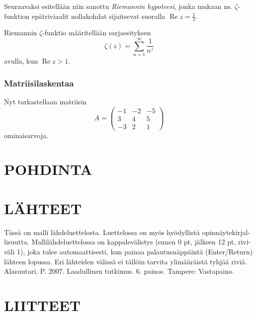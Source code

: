 Seuraavaksi esitellään niin sanottu {\em Riemannin hypoteesi}, jonka mukaan ns. $\zeta$-funktion epätriviaalit nollakohdat sijaitsevat suoralla $\operatorname{Re}z=\frac12$.
\begin{definition} Riemannin $\zeta$-funktio määritellään sarjaesityksen \cite{Riemann}
\[
\zeta(z)=\sum_{n=1}^{\infty}\frac{1}{n^z}
\]
avulla, kun $\operatorname{Re}z>1$.
\end{definition}

\subsubsection{Matriisilaskentaa}

Nyt tarkastellaan matriisin
\[
A=\left(\begin{array}{rrr} -1 & -2 & -5\\ 3& 4& 5\\ -3 & 2 & 1 \end{array}\right)
\]
ominaisarvoja.


\section{POHDINTA}
\lipsum[1]
\vspace{0.7cm}
\lipsum[1]



\newpage\null
\section{LÄHTEET}
 
 Tässä on malli lähdeluettelosta. Luettelossa on myös hyödyllistä opinnäytekirjal-lisuutta. Mallilähdeluettelossa on kappalevälistys (ennen 0 pt, jälkeen 12 pt, rivi-väli 1), joka tulee automaattisesti, kun painaa palautusnäppäintä (Enter/Return) lähteen lopussa.  Eri lähteiden välissä ei tällöin tarvita ylimääräistä tyhjää riviä. \\

Alasuutari, P. 2007. Laadullinen tutkimus. 6. painos. Tampere: Vastapaino.





\newpage\null
\section{LIITTEET}

